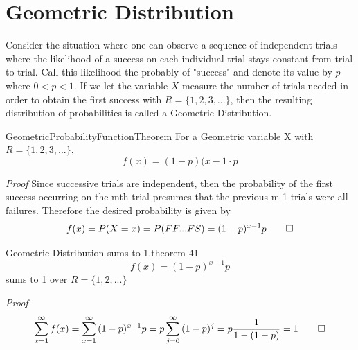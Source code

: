 \documentclass[10pt,]{book}
\makeatletter
\renewcommand*{\proofname}{Proof}
\renewenvironment{proof}[1][\proofname]{\par
  \pushQED{\qed}%
  \normalfont \topsep6\p@\@plus6\p@\relax
  \trivlist
  \item\relax
    {\itshape
    #1\@addpunct{.}}\hspace\labelsep\ignorespaces
}{%
  \popQED\endtrivlist\@endpefalse
}
\numberwithin{equation}{section}
\newcommand{\lt}{<}
\makeatother
\begin{document}
\section[{Geometric Distribution}]{Geometric Distribution}\label{section-47}
\hypertarget{p-875}{}%
Consider the situation where one can observe a sequence  of independent trials where the likelihood of a success on each individual trial stays constant from trial to trial. Call this likelihood the probably of "success" and denote its value by \(p\) where \(0 \lt p \lt 1 \). If we let the variable \(X\) measure the number of trials needed in order to obtain the first success with \(R = \{1, 2, 3, ... \}\), then the resulting distribution of probabilities is called a Geometric Distribution.%
\par
\hypertarget{p-876}{}%
\begin{theorem}{}{}{GeometricProbabilityFunctionTheorem}%
\hypertarget{GeometricProbabilityFunction}{}%
For a Geometric variable X with \(R = \{1, 2, 3, ... \}\),%
\begin{equation*}
f(x) = (1-p)({x-1} \cdot p
\end{equation*}
%
\end{theorem}
\begin{proof}\hypertarget{proof-42}{}
\hypertarget{p-878}{}%
Since successive trials are independent, then the probability of the first success occurring on the mth trial presumes that the previous m-1 trials were all failures.  Therefore the desired probability is given by%
\begin{equation*}
f(x) = P(X = x) = P(FF...FS) = (1-p)^{x-1}p\qedhere
\end{equation*}
%
\end{proof}
%
\par
\hypertarget{p-879}{}%
\begin{theorem}{Geometric Distribution sums to 1.}{}{theorem-41}%
\hypertarget{p-880}{}%
%
\begin{equation*}
f(x) = (1-p)^{x-1}p
\end{equation*}
sums to 1 over \(R = \{ 1, 2, ... \}\)%
\end{theorem}
\begin{proof}\hypertarget{proof-43}{}
\hypertarget{p-881}{}%
%
\begin{equation*}
\sum_{x=1}^{\infty} {f(x)} = \sum_{x=1}^{\infty} {(1-p)^{x-1} p} \\ = p \sum_{j=0}^{\infty} {(1-p)^j} = p \frac{1}{1-(1-p)} = 1\qedhere
\end{equation*}
%
\end{proof}
\end{document}
